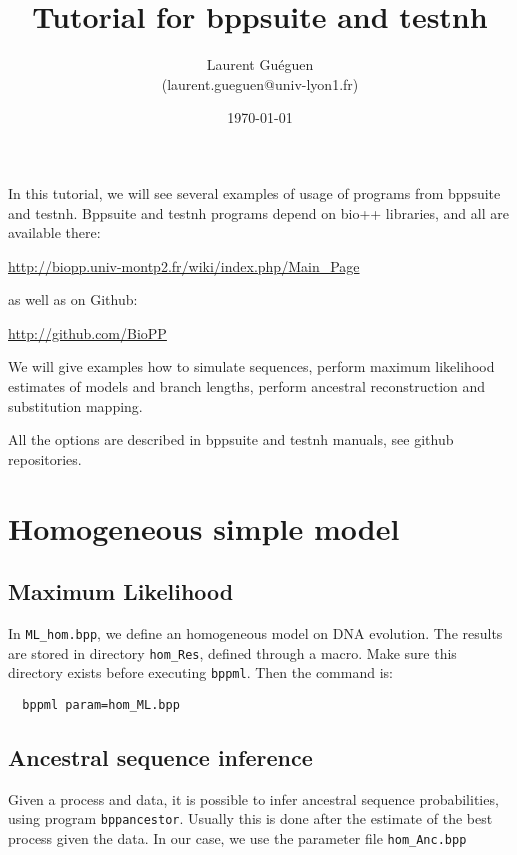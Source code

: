 \documentclass{article}
\title{Tutorial for bppsuite and testnh}
\date{\today}
\author{Laurent Guéguen \\ {\small (laurent.gueguen@univ-lyon1.fr)}}
\begin{document}
\maketitle
\thispagestyle{empty}

\medskip 


In this tutorial, we will see several examples of usage of programs
from bppsuite and testnh. Bppsuite and testnh programs depend on bio++
libraries, and all are available there:

\url{http://biopp.univ-montp2.fr/wiki/index.php/Main_Page}

as well as on Github:

\url{http://github.com/BioPP}

\medskip

We will give examples how to simulate sequences, perform maximum
likelihood estimates of models and branch lengths, perform ancestral
reconstruction and substitution mapping.

All the options are described in bppsuite and testnh manuals, see
github repositories. 


\section{Homogeneous simple model}

\subsection*{Maximum Likelihood}

In \texttt{ML\_hom.bpp}, we define an homogeneous model on DNA evolution.
The results are stored in directory \texttt{hom\_Res}, defined through
a macro. Make sure this directory exists before executing
\texttt{bppml}. Then the command is:

\begin{verbatim}
  bppml param=hom_ML.bpp
\end{verbatim}

\subsection*{Ancestral sequence inference}

Given a process and data, it is possible to infer ancestral sequence
probabilities, using program \texttt{bppancestor}. Usually this is
done after the estimate of the best process given the data. In our
case, we use the parameter file \texttt{hom\_Anc.bpp}
\end{document}
